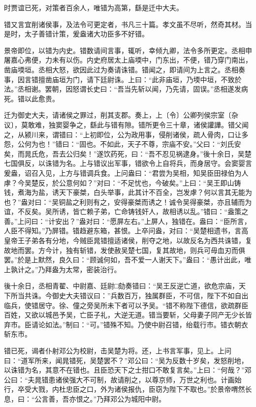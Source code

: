 \documentclass[UTF8,titlepage,oneside]{ctexbook}
\begin{document}
时贾谊已死，对策者百余人，唯错为高第，繇是迁中大夫。

错又言宜削诸侯事，及法令可更定者，书凡三十篇。孝文虽不尽听，然奇其材。当是时，太子善错计策，爰盎诸大功臣多不好错。

景帝即位，以错为内史。错数请间言事，辄听，幸倾九卿，法令多所更定。丞相申屠嘉心弗便，力未有以伤。内史府居太上庙堧中，门东出，不便，错乃穿门南出，凿庙堧垣。丞相大怒，欲因此过为奏请诛错。错闻之，即请间为上言之。丞相奏事，因言错擅凿庙垣为门，请下廷尉诛。上曰：“此非庙垣，乃堧中垣，不致於法。”丞相谢。罢朝，因怒谓长史曰：“吾当先斩以闻，乃先请，固误。”丞相遂发病死。错以此愈贵。

迁为御史大夫，请诸侯之罪过，削其支郡。奏上，上〔令〕公卿列侯宗室〔杂议〕，莫敢难，独窦婴争之，繇此与错有隙。错所更令三十章，诸侯讙譁。错父闻之，从颍川来，谓错曰：“上初即位，公为政用事，侵削诸侯，疏人骨肉，口让多怨，公何为也！”错曰：“固也。不如此，天子不尊，宗庙不安。”父曰：“刘氏安矣，而晁氏危，吾去公归矣！”遂饮药死，曰：“吾不忍见祸逮身。”後十余日，吴楚七国俱反，以诛错为名。上与错议出军事，错欲令上自将兵，而身居守。会窦婴言爰盎，诏召入见，上方与错调兵食。上问盎曰：“君尝为吴相，知吴臣田禄伯为人虖？今吴楚反，於公意何如？”对曰：“不足忧也，今破矣。”上曰：“吴王即山铸钱，煮海为盐，诱天下豪桀，白头举事，此其计不百全，岂发虖？何以言其无能为也？”盎对曰：“吴铜盐之利则有之，安得豪桀而诱之！诚令吴得豪桀，亦且辅而为谊，不反矣。吴所诱，皆亡赖子弟，亡命铸钱奸人，故相诱以乱。”错曰：“盎策之善。”上问曰：“计安出？”盎对曰：“愿屏左右。”上屏人，独错在。盎曰：“臣所言，人臣不得知。”乃屏错。错趋避东箱，甚恨。上卒问盎，对曰：“吴楚相遗书，言高皇帝王子弟各有分地，今贼臣晁错擅适诸侯，削夺之地，以故反名为西共诛错，复故地而罢。方今计，独有斩错，发使赦吴楚七国，复其故地，则兵可毋血刃而俱罢。”於是上默然，良久曰：“顾诚何如，吾不爱一人谢天下。”盎曰：“愚计出此，唯上孰计之。”乃拜盎为太常，密装治行。

後十余日，丞相青翟、中尉嘉、廷尉□劾奏错曰：“吴王反逆亡道，欲危宗庙，天下所当共诛。今御史大夫错议曰：”兵数百万，独属群臣，不可信，陛下不如自出临兵，使错居守。徐、僮之旁吴所未下者可以予吴。“错不称陛下德信，欲疏群臣百姓，又欲以城邑予吴，亡臣子礼，大逆无道。错当要斩，父母妻子同产无少长皆弃巿。臣请论如法。”制曰：“可。”错殊不知。乃使中尉召错，绐载行巿。错衣朝衣斩东巿。

错已死，谒者仆射邓公为校尉，击吴楚为将。还，上书言军事，见上。上问曰：“道军所来，闻晁错死，吴楚罢不？”邓公曰：“吴为反数十岁矣，发怒削地，以诛错为名，其意不在错也。且臣恐天下之士拑口不敢复言矣。”上曰：“何哉？”邓公曰：“夫晁错患诸侯强大不可制，故请削之，以尊京师，万世之利也。计画始行，卒受大戮，内杜忠臣之口，外为诸侯报仇，臣窃为陛下不取也。”於景帝喟然长息，曰：“公言善，吾亦恨之。”乃拜邓公为城阳中尉。
\end{document}
